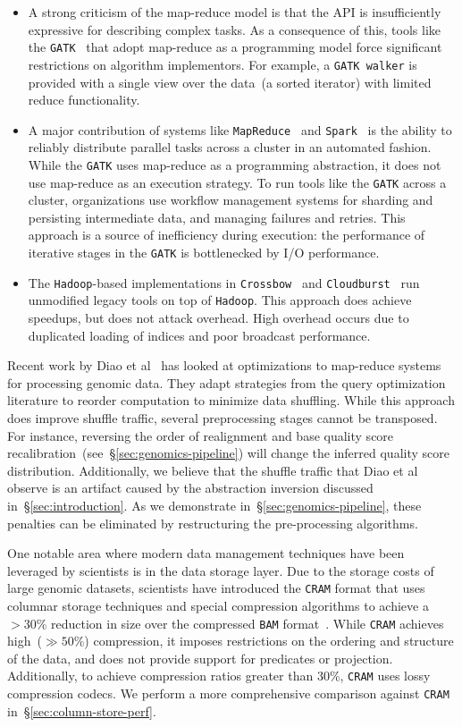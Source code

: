 \documentclass{sig-alternate}
\begin{document}
\begin{itemize}
\item A strong criticism of the map-reduce model is that the API is insufficiently expressive
for describing complex tasks. As a consequence of this, tools like the \texttt{GATK}~\cite{mckenna10} that
adopt map-reduce as a programming model force significant restrictions on algorithm implementors. For
example, a \texttt{GATK walker} is provided with a single view over the data~(a sorted iterator) with limited reduce
functionality.
\item A major contribution of systems like \texttt{MapReduce}~\cite{dean08} and \texttt{Spark}~\cite{zaharia10,
zaharia12} is the ability to reliably distribute parallel tasks across a cluster in an automated fashion. While
the \texttt{GATK} uses map-reduce as a programming abstraction, it does not use map-reduce as an execution strategy.
To run tools like the \texttt{GATK} across a cluster, organizations use workflow management systems for sharding and
persisting intermediate data, and managing failures and retries. This approach is a source of inefficiency during
execution: the performance of iterative stages in the \texttt{GATK} is bottlenecked by I/O performance.
\item The \texttt{Hadoop}-based implementations in \texttt{Crossbow}~\cite{langmead09} and
\texttt{Cloudburst}~\cite{schatz09} run unmodified legacy tools on top of \texttt{Hadoop}. This approach does
achieve speedups, but does not attack overhead. High overhead occurs due to duplicated loading of indices and poor
broadcast performance.
\end{itemize}

Recent work by Diao et al~\cite{diao15} has looked at optimizations to map-reduce systems for
processing genomic data. They adapt strategies from the query optimization literature to reorder
computation to minimize data shuffling. While this approach does improve shuffle traffic, several
preprocessing stages cannot be transposed. For instance, reversing the order of realignment and
base quality score recalibration~(see~\S\ref{sec:genomics-pipeline}) will change the inferred quality
score distribution. Additionally, we believe that the shuffle traffic that Diao et al observe is an artifact
caused by the abstraction inversion discussed in~\S\ref{sec:introduction}. As we demonstrate
in~\S\ref{sec:genomics-pipeline}, these penalties can be eliminated by restructuring the pre-processing
algorithms.

One notable area where modern data management techniques have been leveraged by scientists is in
the data storage layer. Due to the storage costs of large genomic datasets, scientists have introduced the
\texttt{CRAM} format that uses columnar storage techniques and special compression algorithms to achieve a
$>30$\% reduction in size over the compressed \texttt{BAM} format~\cite{fritz11}. While \texttt{CRAM} achieves
high~($\gg 50\%$) compression, it imposes restrictions on the ordering and structure of the data, and does not provide
support for predicates or projection. Additionally, to achieve compression ratios greater than 30\%, \texttt{CRAM} uses
lossy compression codecs. We perform a more comprehensive comparison against \texttt{CRAM}
in~\S\ref{sec:column-store-perf}.
\end{document}
